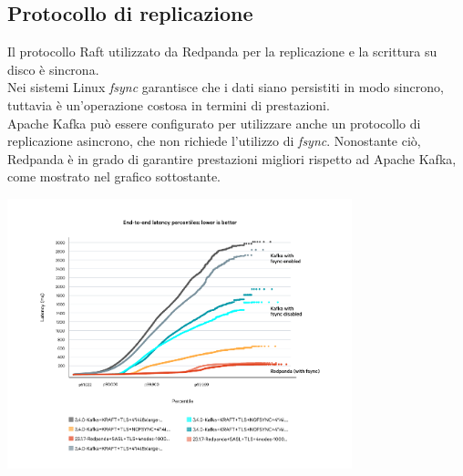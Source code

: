\subsection{Protocollo di replicazione}
Il protocollo Raft utilizzato da Redpanda per la replicazione e la scrittura su disco è sincrona. \\
Nei sistemi Linux \textit{fsync} garantisce che i dati siano persistiti in modo sincrono, tuttavia
è un'operazione costosa in termini di prestazioni.\\
Apache Kafka può essere configurato per utilizzare anche un protocollo di replicazione asincrono, che non richiede l'utilizzo di \textit{fsync}.
Nonostante ciò, Redpanda è in grado di garantire prestazioni migliori rispetto ad Apache Kafka, come mostrato nel grafico sottostante.

\begin{center}
	\includegraphics[width=0.75\textwidth]{imgs/fsync.png}
\end{center}




























